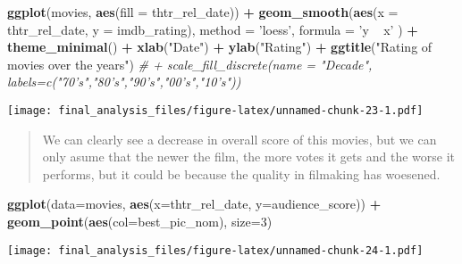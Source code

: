 \documentclass[]{article}
\newenvironment{Shaded}{\begin{snugshade}}{\end{snugshade}}
\newcommand{\CommentTok}[1]{\textcolor[rgb]{0.56,0.35,0.01}{\textit{#1}}}
\newcommand{\DataTypeTok}[1]{\textcolor[rgb]{0.13,0.29,0.53}{#1}}
\newcommand{\DecValTok}[1]{\textcolor[rgb]{0.00,0.00,0.81}{#1}}
\newcommand{\KeywordTok}[1]{\textcolor[rgb]{0.13,0.29,0.53}{\textbf{#1}}}
\newcommand{\NormalTok}[1]{#1}
\newcommand{\OperatorTok}[1]{\textcolor[rgb]{0.81,0.36,0.00}{\textbf{#1}}}
\newcommand{\StringTok}[1]{\textcolor[rgb]{0.31,0.60,0.02}{#1}}
\begin{document}
\begin{Shaded}
\begin{Highlighting}[]
\KeywordTok{ggplot}\NormalTok{(movies, }\KeywordTok{aes}\NormalTok{(}\DataTypeTok{fill =}\NormalTok{ thtr_rel_date)) }\OperatorTok{+}\StringTok{ }\KeywordTok{geom_smooth}\NormalTok{(}\KeywordTok{aes}\NormalTok{(}\DataTypeTok{x =}\NormalTok{ thtr_rel_date, }\DataTypeTok{y =}\NormalTok{ imdb_rating), }\DataTypeTok{method =} \StringTok{'loess'}\NormalTok{, }\DataTypeTok{formula =} \StringTok{'y ~ x'}
\NormalTok{) }\OperatorTok{+}\StringTok{ }\KeywordTok{theme_minimal}\NormalTok{() }\OperatorTok{+}\StringTok{ }\KeywordTok{xlab}\NormalTok{(}\StringTok{"Date"}\NormalTok{) }\OperatorTok{+}\StringTok{ }\KeywordTok{ylab}\NormalTok{(}\StringTok{"Rating"}\NormalTok{) }\OperatorTok{+}\StringTok{ }\KeywordTok{ggtitle}\NormalTok{(}\StringTok{"Rating of  movies over the years"}\NormalTok{) }\CommentTok{# + scale_fill_discrete(name = "Decade", labels=c("70's","80's","90's","00's","10's"))}
\end{Highlighting}
\end{Shaded}

\texttt{[image: final\_analysis\_files/figure-latex/unnamed-chunk-23-1.pdf]}

\begin{quote}
We can clearly see a decrease in overall score of this movies, but we
can only asume that the newer the film, the more votes it gets and the
worse it performs, but it could be because the quality in filmaking has
woesened.
\end{quote}

\begin{Shaded}
\begin{Highlighting}[]
\KeywordTok{ggplot}\NormalTok{(}\DataTypeTok{data=}\NormalTok{movies, }\KeywordTok{aes}\NormalTok{(}\DataTypeTok{x=}\NormalTok{thtr_rel_date, }\DataTypeTok{y=}\NormalTok{audience_score)) }\OperatorTok{+}\StringTok{ }\KeywordTok{geom_point}\NormalTok{(}\KeywordTok{aes}\NormalTok{(}\DataTypeTok{col=}\NormalTok{best_pic_nom), }\DataTypeTok{size=}\DecValTok{3}\NormalTok{)}
\end{Highlighting}
\end{Shaded}

\texttt{[image: final\_analysis\_files/figure-latex/unnamed-chunk-24-1.pdf]}
\end{document}
